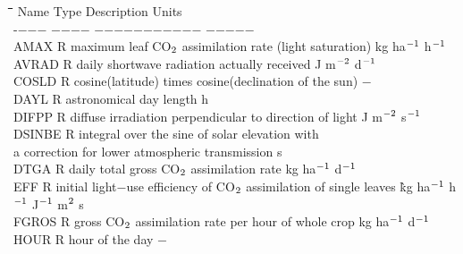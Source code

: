 \begin{tabbing}
\hspace{1.27cm}\=\hspace{1.27cm}\=\hspace{1.27cm}\=\hspace{1.27cm}\=%
\hspace{1.27cm}\=\hspace{1.27cm}\=\hspace{1.27cm}\=\hspace{1.27cm}\=%
\hspace{1.27cm}\=\hspace{1.27cm}\=\kill
Name    \> \> Type   \> Description                                        \> \> \> \> \> \> \> Units\\
-$-$$-$$-$    \> \> $-$$-$$-$$-$   \> $-$$-$$-$$-$$-$$-$$-$$-$$-$$-$$-$                                        \> \> \> \> \> \> \> $-$$-$$-$$-$$-$\\
AMAX    \> \> R   \> maximum leaf CO$_{{\rm 2}}$ assimilation rate (light saturation)\> \> \> \> \> \> \> kg ha$^{{\rm -1}}$ h$^{{\rm -1}}$\\
AVRAD   \> \> R   \> daily shortwave radiation actually received  \> \> \> \> \> \> \> J m$^{{\rm -2}}$ d$^{{\rm -1}}$\\
COSLD   \> \> R   \> cosine(latitude) times cosine(declination of the sun)           \> \> \> \> \> \> \> $-$\\
DAYL    \> \> R   \> astronomical day length\> \> \>  \> \> \> \> h\\
DIFPP\> \> R\> diffuse irradiation perpendicular to direction of light\> \> \> \> \> \> \> J m$^{{\rm -2}}$ s$^{{\rm -1}}$\\
DSINBE\> \> R\> integral over the sine of solar elevation with\\
\>\> \> a correction for lower atmospheric transmission\> \> \> \> \> \> \> s\\
DTGA    \> \> R   \> daily total gross CO$_{{\rm 2}}$  assimilation rate       \> \> \> \> \> \> \> kg ha$^{{\rm -1}}$ d$^{{\rm -1}}$ \\
EFF     \> \> R   \> initial light$-$use efficiency of CO$_{{\rm 2}}$ assimilation of single leaves \`kg ha$^{{\rm -1}}$ h$^{{\rm -1}}$ J$^{{\rm -1}}$ m$^{{\rm 2}}$ s\\
FGROS   \> \> R   \> gross CO$_{{\rm 2}}$ assimilation rate per hour of whole crop        \> \> \> \> \> \> \> kg ha$^{{\rm -1}}$ d$^{{\rm -1}}$ \\
HOUR    \> \> R   \> hour of the day                                    \> \> \> \> \> \> \> $-$\\
$$
\end{tabbing}
